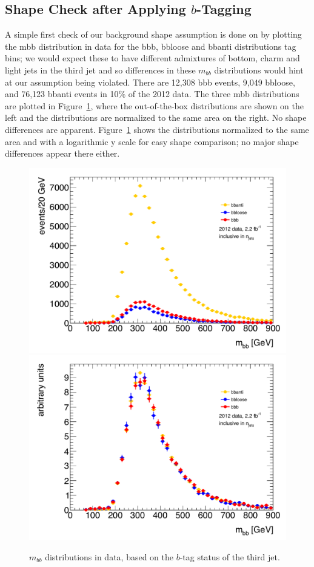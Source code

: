 \subsection{Shape Check after Applying $b$-Tagging}
A simple first check of our background shape assumption is done on by plotting the mbb distribution
 in data for the bbb, bbloose and bbanti distributions tag bins; we would expect these to have different
 admixtures of bottom, charm and light jets in the third jet and so differences in these $m_{bb}$ distributions
 would hint at our assumption being violated. There are 12,308 bbb events, 9,049 bbloose, and 76,123
 bbanti events in 10\% of the 2012 data. The three mbb distributions are plotted in Figure~\ref{fig:mbb_data}, where the
 out-of-the-box distributions are shown on the left and the distributions are normalized to the same area
 on the right. No shape differences are apparent. Figure~\ref{fig:mbb_data} shows the distributions normalized to the
 same area and with a logarithmic y scale for easy shape comparison; no major shape differences appear
 there either.

\begin{figure}[hbt]
  \includegraphics[width=0.5\linewidth]{BackgroundEstimation/images/mbb_bbb_bbloose_bbanti_r200-215.pdf}
  \includegraphics[width=0.5\linewidth]{BackgroundEstimation/images/mbb_bbb_bbloose_bbanti_r200-215_normalized.pdf}
  \caption{$m_{bb}$ distributions in data, based on the $b$-tag status of the third jet. 
    \label{fig:mbb_data} }
\end{figure}


